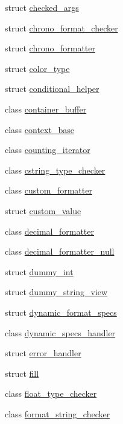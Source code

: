 \begin{DoxyCompactItemize}
struct \hyperlink{structinternal_1_1checked__args}{checked\+\_\+args}
\item 
struct \hyperlink{structinternal_1_1chrono__format__checker}{chrono\+\_\+format\+\_\+checker}
\item 
struct \hyperlink{structinternal_1_1chrono__formatter}{chrono\+\_\+formatter}
\item 
struct \hyperlink{structinternal_1_1color__type}{color\+\_\+type}
\item 
struct \hyperlink{structinternal_1_1conditional__helper}{conditional\+\_\+helper}
\item 
class \hyperlink{classinternal_1_1container__buffer}{container\+\_\+buffer}
\item 
class \hyperlink{classinternal_1_1context__base}{context\+\_\+base}
\item 
class \hyperlink{classinternal_1_1counting__iterator}{counting\+\_\+iterator}
\item 
class \hyperlink{classinternal_1_1cstring__type__checker}{cstring\+\_\+type\+\_\+checker}
\item 
class \hyperlink{classinternal_1_1custom__formatter}{custom\+\_\+formatter}
\item 
struct \hyperlink{structinternal_1_1custom__value}{custom\+\_\+value}
\item 
class \hyperlink{classinternal_1_1decimal__formatter}{decimal\+\_\+formatter}
\item 
class \hyperlink{classinternal_1_1decimal__formatter__null}{decimal\+\_\+formatter\+\_\+null}
\item 
struct \hyperlink{structinternal_1_1dummy__int}{dummy\+\_\+int}
\item 
struct \hyperlink{structinternal_1_1dummy__string__view}{dummy\+\_\+string\+\_\+view}
\item 
struct \hyperlink{structinternal_1_1dynamic__format__specs}{dynamic\+\_\+format\+\_\+specs}
\item 
class \hyperlink{classinternal_1_1dynamic__specs__handler}{dynamic\+\_\+specs\+\_\+handler}
\item 
struct \hyperlink{structinternal_1_1error__handler}{error\+\_\+handler}
\item 
struct \hyperlink{structinternal_1_1fill}{fill}
\item 
class \hyperlink{classinternal_1_1float__type__checker}{float\+\_\+type\+\_\+checker}
\item 
class \hyperlink{classinternal_1_1format__string__checker}{format\+\_\+string\+\_\+checker}
\item 

\end{DoxyCompactItemize}
